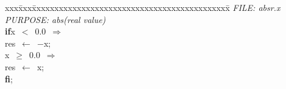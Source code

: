 \documentclass{report}
\begin{document}
\pagestyle{empty}
\begin{tabbing}
xxx\=xxx\=xxxxxxxxxxxxxxxxxxxxxxxxxxxxxxxxxxxxxxxxxxxx\=\kill
{\tt{}}{\em{} FILE:   absr.x
}\\
{\tt{}}{\em{} PURPOSE:  abs(real value)
}\\
{\bf if}\>x\ $<$\ 0.0\ $\Rightarrow$
\\
\>res\ $\leftarrow$\ $-$x;\\
\raisebox{2pt}{\ \framebox[2pt]{\rule{0pt}{1pt}}}
\>x\ $\geq$\ 0.0\ $\Rightarrow$
\\
\>res\ $\leftarrow$\ x;\\
{\bf {f}{i}};
\\
\end{tabbing}
\end{document}
